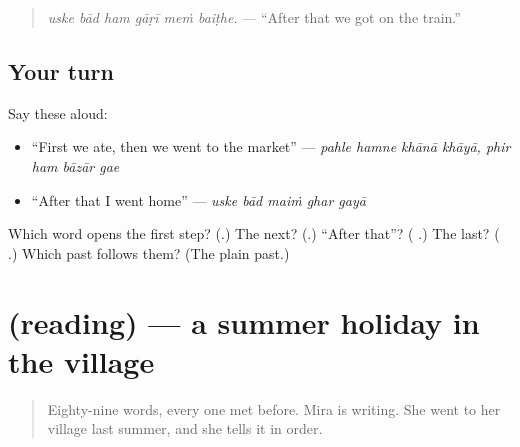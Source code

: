 \begin{quote}
\textbf{     }
\end{quote}

\begin{quote}
\emph{uske bād ham gāṛī meṁ baiṭhe.} — \textquotedblleft{}After that we got on the train.\textquotedblright{}
\end{quote}

\subsection*{Your turn}
Say these aloud:

\begin{itemize}
\raggedright
  \item \textquotedblleft{}First we ate, then we went to the market\textquotedblright{} — \emph{pahle hamne khānā khāyā, phir ham bāzār gae}
  \item \textquotedblleft{}After that I went home\textquotedblright{} — \emph{uske bād maiṁ ghar gayā}
\end{itemize}

\begin{tcolorbox}[breakable,colback=teal!4,colframe=teal!35!black,title={Before you move on}]
Which word opens the first step? (\textbf{}.) The next? (\textbf{}.) \textquotedblleft{}After that\textquotedblright{}? (\textbf{ }.) The last? (\textbf{ }.) Which past follows them? (The plain past.)
\end{tcolorbox}
\section[(reading)]{(reading) — a summer holiday in the village}

\label{lesson:HI-C279-chuttikadin}



\begin{quote}
Eighty-nine words, every one met before. Mira is writing. She went to her village last summer, and she tells it in order.
\end{quote}

